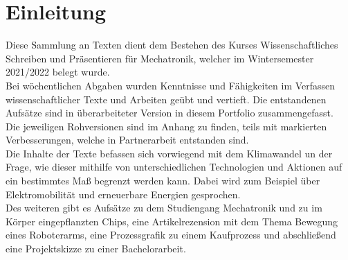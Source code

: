 \chapter{Einleitung}
Diese Sammlung an Texten dient dem Bestehen des Kurses Wissenschaftliches Schreiben und Präsentieren für Mechatronik, welcher im Wintersemester 2021/2022 belegt wurde.\\
Bei wöchentlichen Abgaben wurden Kenntnisse und Fähigkeiten im Verfassen wissenschaftlicher Texte und Arbeiten geübt und vertieft. Die entstandenen Aufsätze sind in überarbeiteter Version in diesem Portfolio zusammengefasst. \\
Die jeweiligen Rohversionen sind im Anhang zu finden, teils mit markierten Verbesserungen, welche in Partnerarbeit entstanden sind.\\
Die Inhalte der Texte befassen sich vorwiegend mit dem Klimawandel un der Frage, wie dieser mithilfe von unterschiedlichen Technologien und Aktionen auf ein bestimmtes Maß begrenzt werden kann. Dabei wird zum Beispiel über Elektromobilität und erneuerbare Energien gesprochen.\\
Des weiteren gibt es Aufsätze zu dem Studiengang Mechatronik und zu im Körper eingepflanzten Chips, eine Artikelrezension mit dem Thema Bewegung eines Roboterarms, eine Prozessgrafik zu einem Kaufprozess und abschließend eine Projektskizze zu einer Bachelorarbeit.
